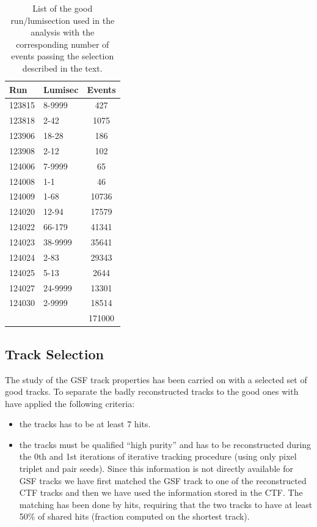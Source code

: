 \begin{table}[htbp]
\begin{center}
\begin{tabular}{|l|l|c|}
\hline
Run  & Lumisec & \multicolumn{1}{l|}{Events} \\ \hline
123815 & 8-9999 & 427 \\ \hline
123818 & 2-42 & 1075 \\ \hline
123906 & 18-28 & 186 \\ \hline
123908 & 2-12 & 102 \\ \hline
124006 & 7-9999 & 65 \\ \hline
124008 & 1-1 & 46 \\ \hline
124009 & 1-68 & 10736 \\ \hline
124020 & 12-94 & 17579 \\ \hline
124022 & 66-179 & 41341 \\ \hline
124023 & 38-9999 & 35641 \\ \hline
124024 & 2-83 & 29343 \\ \hline
124025 & 5-13 & 2644 \\ \hline
124027 & 24-9999 & 13301 \\ \hline
124030 & 2-9999 & 18514 \\ \hline
 &  & 171000 \\ \hline
\end{tabular}
\caption{List of the good run/lumisection used in the analysis with the corresponding number of events passing the selection described in the text.}
\label{tab:run lumis}
\end{center}
\end{table}

\subsection{Track Selection}

The study of the GSF track properties has been carried on with a selected set of good tracks.
To separate the badly reconstructed tracks to the good ones with have applied the following criteria:

\begin{itemize}
\item the tracks has to be at least 7 hits.
\item the tracks must be qualified ``high purity'' and has to be reconstructed during the 0th and 1st iterations
of iterative tracking procedure (using only pixel triplet and pair seeds). Since this information is not 
directly available for GSF tracks we have first matched the GSF track to one of the reconstructed CTF tracks and
then we have used the information stored in the CTF. The matching has been done by hits, requiring that the
two tracks to have at least 50\% of shared hits (fraction computed on the shortest track).
\end{itemize}

